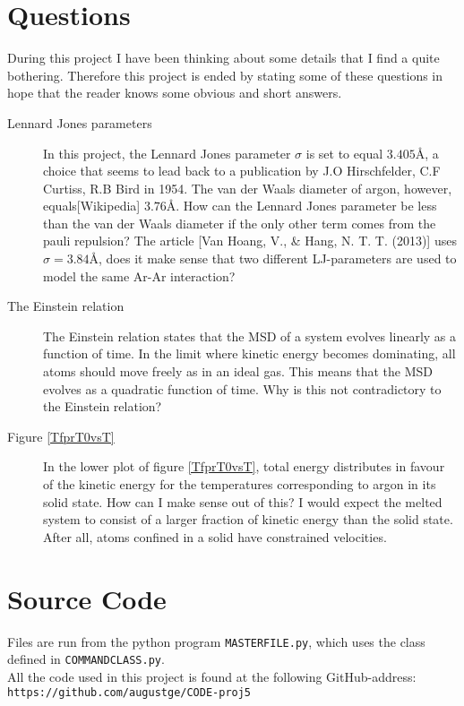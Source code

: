 \documentclass[twoside,utf8]{article}
\begin{document}
\begin{multicols}{2}
\section{Questions}
During this project I have been thinking about some details that I find a quite bothering. Therefore this project is ended by stating some of these questions in hope that the reader knows some obvious and short answers.

\begin{description}
\item[Lennard Jones parameters] In this project, the Lennard Jones parameter $\sigma$ is set to equal $3.405$\r{A}, a choice that seems to lead back to a publication by J.O Hirschfelder, C.F Curtiss, R.B Bird in 1954. The van der Waals diameter of argon, however, equals[Wikipedia] $3.76$\r{A}. How can the Lennard Jones parameter be less than the van der Waals diameter if the only other term comes from the pauli repulsion? The article [Van Hoang, V., \& Hang, N. T. T. (2013)] uses $\sigma=3.84$\r{A}, does it make sense that two different LJ-parameters are used to model the same Ar-Ar interaction?

\item[The Einstein relation] The Einstein relation states that the MSD of a system evolves linearly as a function of time. In the limit where kinetic energy becomes dominating, all atoms should move freely as in an ideal gas. This means that the MSD evolves as a quadratic function of time. Why is this not contradictory to the Einstein relation?

\item[Figure \ref*{TfprT0vsT}] In the lower plot of figure \ref*{TfprT0vsT}, total energy distributes in favour of the kinetic energy for the temperatures corresponding to argon in its solid state. How can I make sense out of this? I would expect the melted system to consist of a larger fraction of kinetic energy than the solid state. After all, atoms confined in a solid have constrained velocities.

\end{description}


\section{Source Code}
Files are run from the python program \texttt{MASTERFILE.py}, which uses the class defined in \texttt{COMMANDCLASS.py}. \\
All the code used in this project is found at the following GitHub-address: \texttt{https://github.com/augustge/CODE-proj5}




\end{multicols}
\end{document}
